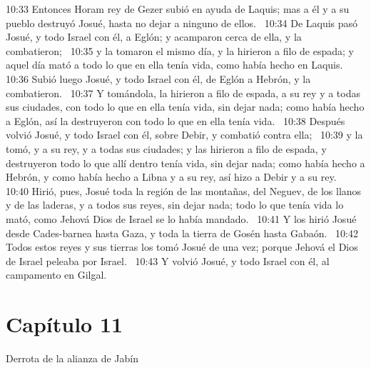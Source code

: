 10:33 Entonces Horam rey de Gezer subió en ayuda de Laquis; mas a él y a su pueblo destruyó Josué, hasta no dejar a ninguno de ellos.  
10:34 De Laquis pasó Josué, y todo Israel con él, a Eglón; y acamparon cerca de ella, y la combatieron;  
10:35 y la tomaron el mismo día, y la hirieron a filo de espada; y aquel día mató a todo lo que en ella tenía vida, como había hecho en Laquis.  
10:36 Subió luego Josué, y todo Israel con él, de Eglón a Hebrón, y la combatieron.  
10:37 Y tomándola, la hirieron a filo de espada, a su rey y a todas sus ciudades, con todo lo que en ella tenía vida, sin dejar nada; como había hecho a Eglón, así la destruyeron con todo lo que en ella tenía vida.  
10:38 Después volvió Josué, y todo Israel con él, sobre Debir, y combatió contra ella;  
10:39 y la tomó, y a su rey, y a todas sus ciudades; y las hirieron a filo de espada, y destruyeron todo lo que allí dentro tenía vida, sin dejar nada; como había hecho a Hebrón, y como había hecho a Libna y a su rey, así hizo a Debir y a su rey.  
10:40 Hirió, pues, Josué toda la región de las montañas, del Neguev, de los llanos y de las laderas, y a todos sus reyes, sin dejar nada; todo lo que tenía vida lo mató, como Jehová Dios de Israel se lo había mandado.  
10:41 Y los hirió Josué desde Cades-barnea hasta Gaza, y toda la tierra de Gosén hasta Gabaón.  
10:42 Todos estos reyes y sus tierras los tomó Josué de una vez; porque Jehová el Dios de Israel peleaba por Israel.  
10:43 Y volvió Josué, y todo Israel con él, al campamento en Gilgal.  
\section*{Capítulo 11 }
Derrota de la alianza de Jabín  

